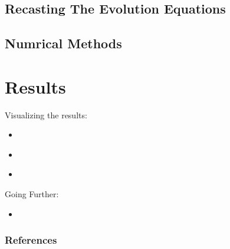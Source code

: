 \documentclass[aspectratio=169]{beamer}
\begin{document}

    \subsection{Recasting The Evolution Equations} %
    \label{sec:recasting_the_evolution_equations}


    \subsection{Numrical Methods} %
    \label{sec:numrical_methods}



  \section{Results} %
  \label{sec:results}
    \begin{frame}
      Visualizing the results:
      \begin{itemize}
        \item{
          \href{run:videos/sxs-vortex-tendex_visualization-head-on_collision.mp4}{}
          \href{https://www.youtube.com/watch?v=4nM6kf2OAFw}{}
        }
        \item{
          \href{run:videos/sxs-demo_binary_orbit_and_collision.mp4}{}
          \href{https://www.youtube.com/watch?v=p647WrQd684}{}
        }
        \item{
          \href{run:videos/sxs-highly-precessing_bbh_run.mp4}{}
          \href{https://www.youtube.com/watch?v=grA5KfDlsAY}{}
        }
      \end{itemize}
      \bigskip

      Going Further:
      \begin{itemize}
        \item{
          \href{run:videos/nasa-colliding_neutron_stars_create_black_hole_and_gamma-ray_burst.webm}{}
          \href{https://www.youtube.com/watch?v=ow9JCXy1QdY&t=2s}{}
        }
      \end{itemize}
    \end{frame}

  \begin{frame}
    \frametitle{References}
    \scriptsize
    \begin{multicols}{2}
      \nocite{*}
      
    \end{multicols}
  \end{frame}
\end{document}
